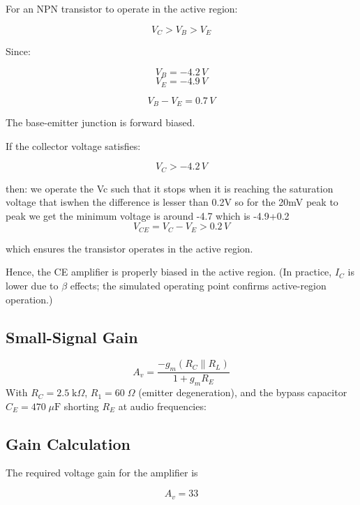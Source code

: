 \documentclass[10pt,twocolumn]{article}
\begin{document}
For an NPN transistor to operate in the active region:

\[
V_C > V_B > V_E
\]

Since:

\[
V_B = -4.2\,V
\]
\[
V_E = -4.9\,V
\]

\[
V_B - V_E = 0.7\,V
\]

The base-emitter junction is forward biased.

If the collector voltage satisfies:

\[
V_C > -4.2\,V
\]

then:
we operate the Vc such that it stops when it is reaching the saturation voltage that iswhen the difference is lesser than 0.2V so for the 20mV peak to peak we get the minimum voltage is around -4.7 which is -4.9+0.2
\[
V_{CE} = V_C - V_E > 0.2\,V
\]

which ensures the transistor operates in the active region.

Hence, the CE amplifier is properly biased in the active region.
(In practice, $I_C$ is lower due to $\beta$ effects; the simulated operating point confirms active-region operation.)


\subsection{Small-Signal Gain}
\begin{equation}
    A_v = \frac{-g_m (R_C \| R_L)}{1 + g_m R_E}
\end{equation}
With $R_C = 2.5\;\text{k}\Omega$, $R_1 = 60\;\Omega$ (emitter degeneration), and the bypass capacitor $C_E = 470\;\mu\text{F}$ shorting $R_E$ at audio frequencies:
\subsection{Gain Calculation}

The required voltage gain for the amplifier is

\[
A_v = 33
\]
\end{document}
